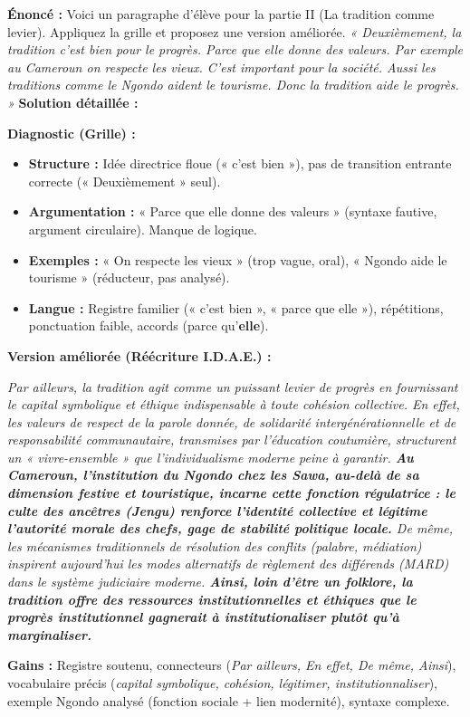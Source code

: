 \documentclass[11pt]{article}
\newcommand{\cle}[1]{{\popxbold\color{popdark}#1}}
\begin{document}
\begin{exoresolu}
\textbf{Énoncé :} Voici un paragraphe d'élève pour la partie II (La tradition comme levier). Appliquez la grille et proposez une version améliorée.
\emph{« Deuxièmement, la tradition c'est bien pour le progrès. Parce que elle donne des valeurs. Par exemple au Cameroun on respecte les vieux. C'est important pour la société. Aussi les traditions comme le Ngondo aident le tourisme. Donc la tradition aide le progrès. »}
\tcblower
\textbf{Solution détaillée :}

\textbf{Diagnostic (Grille) :}
\begin{itemize}
    \item \textbf{Structure :} Idée directrice floue (« c'est bien »), pas de transition entrante correcte (« Deuxièmement » seul).
    \item \textbf{Argumentation :} « Parce que elle donne des valeurs » (syntaxe fautive, argument circulaire). Manque de logique.
    \item \textbf{Exemples :} « On respecte les vieux » (trop vague, oral), « Ngondo aide le tourisme » (réducteur, pas analysé).
    \item \textbf{Langue :} Registre familier (« c'est bien », « parce que elle »), répétitions, ponctuation faible, accords (parce qu'\textbf{elle}).
\end{itemize}

\textbf{Version améliorée (Réécriture I.D.A.E.) :}

\emph{Par ailleurs, la tradition agit comme un puissant levier de progrès en fournissant le capital symbolique et éthique indispensable à toute cohésion collective. En effet, les valeurs de respect de la parole donnée, de solidarité intergénérationnelle et de responsabilité communautaire, transmises par l'éducation coutumière, structurent un « vivre-ensemble » que l'individualisme moderne peine à garantir. \textbf{Au Cameroun, l'institution du \cle{Ngondo} chez les Sawa, au-delà de sa dimension festive et touristique, incarne cette fonction régulatrice : le culte des ancêtres (Jengu) renforce l'identité collective et légitime l'autorité morale des chefs, gage de stabilité politique locale.} De même, les mécanismes traditionnels de résolution des conflits (palabre, médiation) inspirent aujourd'hui les modes alternatifs de règlement des différends (MARD) dans le système judiciaire moderne. \textbf{Ainsi, loin d'être un folklore, la tradition offre des ressources institutionnelles et éthiques que le progrès institutionnel gagnerait à institutionaliser plutôt qu'à marginaliser.}}

\textbf{Gains :} Registre soutenu, connecteurs (\emph{Par ailleurs, En effet, De même, Ainsi}), vocabulaire précis (\emph{capital symbolique, cohésion, légitimer, institutionnaliser}), exemple Ngondo analysé (fonction sociale + lien modernité), syntaxe complexe.
\end{exoresolu}
\end{document}
